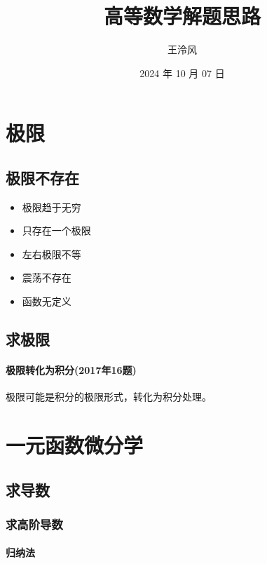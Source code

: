 \documentclass[a4paper,12pt,UTF8]{ctexart}
\begin{document}
    \title{高等数学解题思路}
    \author{王泠风}
    \date{2024 年 10 月 07 日}
    \maketitle

    \section{极限}

    \subsection{极限不存在}
    \begin{itemize}
        \item 极限趋于无穷
        \item 只存在一个极限
        \item 左右极限不等
        \item 震荡不存在
        \item 函数无定义
    \end{itemize}

    \subsection{求极限}

    \paragraph{极限转化为积分(2017年16题)} 极限可能是积分的极限形式，转化为积分处理。

    \section{一元函数微分学}

    \subsection{求导数}

    \subsubsection{求高阶导数}

    \paragraph{归纳法}
\end{document}

